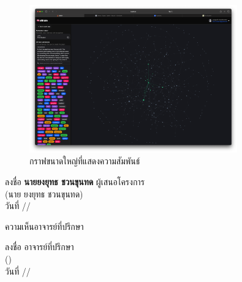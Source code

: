 \documentclass[12pt,a4paper]{article}
\newcommand{\textlight}[1]{{\thailightfont #1}}
\newcommand{\dotrule}[1]{\hdashrule{#1}{0.6pt}{1pt}}
\begin{document}
\begin{enumerate}[leftmargin=2cm]
    \begin{figure}[H]
        \centering
        \includegraphics[width=0.8\textwidth]{images/platform_1.png}
        \caption{กราฟขนาดใหญ่ที่แสดงความสัมพันธ์}
        \label{fig:platform_1}
    \end{figure}

\end{enumerate}

\vspace{5cm}

\hfill\begin{minipage}{10cm}
    \vspace{0.5cm}
    \begin{center}
        \textlight{ลงชื่อ \textbf{นายยงยุทธ ชวนขุนทด} ผู้เสนอโครงการ}\\[0.2cm]
        \textlight{(นาย ยงยุทธ ชวนขุนทด)}\\[0.4cm]
        \textlight{วันที่ \dotrule{50pt}/\dotrule{50pt}/\dotrule{50pt}}
    \end{center}
    \vspace{0.5cm}
\end{minipage}         

\vspace{0.5cm}

\textlight{ความเห็นอาจารย์ที่ปรึกษา}
\dotrule{378pt}

\dotrule{500pt}

\dotrule{500pt}

\vspace{0.5cm}

\hfill\begin{minipage}{10cm}
    \vspace{0.5cm}
    \begin{center}
        \textlight{ลงชื่อ \dotrule{150pt} อาจารย์ที่ปรึกษา}\\[0.2cm]
        \textlight{(\dotrule{180pt})}\\[0.4cm]
        \textlight{วันที่ \dotrule{50pt}/\dotrule{50pt}/\dotrule{50pt}}
    \end{center}
    \vspace{0.5cm}
\end{minipage}                          
\end{document}

